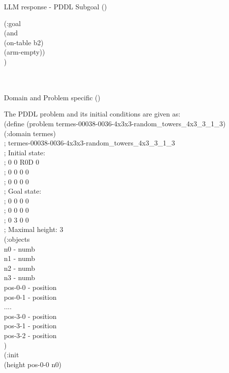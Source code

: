 LLM response - PDDL Subgoal (\blocks) \\
\begin{tcolorbox}[greenbox]
\begin{minipage}{0.95\columnwidth}
(:goal \\
(and \\
(on-table b2) \\
(arm-empty)) \\
)
\end{minipage}
\end{tcolorbox} \\ \\
\newpage
\noindent Domain and Problem specific (\termes) \\
\begin{tcolorbox}[redbox]
\begin{minipage}{0.95\columnwidth}
The PDDL problem and its initial conditions are given as:  \\
(define (problem termes-00038-0036-4x3x3-random\_towers\_4x3\_3\_1\_3) \\
(:domain termes) \\
; termes-00038-0036-4x3x3-random\_towers\_4x3\_3\_1\_3 \\
; Initial state: \\
;  0   0  R0D  0 \\
;  0   0   0   0 \\
;  0   0   0   0 \\
; Goal state: \\
;  0   0   0   0 \\
;  0   0   0   0 \\
;  0   3   0   0 \\
; Maximal height: 3\\
(:objects \\
    n0 - numb \\
    n1 - numb \\
    n2 - numb \\
    n3 - numb \\
    pos-0-0 - position \\
    pos-0-1 - position \\
.... \\
    pos-3-0 - position \\
    pos-3-1 - position \\
    pos-3-2 - position \\
) \\
(:init \\
    (height pos-0-0 n0) \\

\end{minipage}
\end{tcolorbox}
